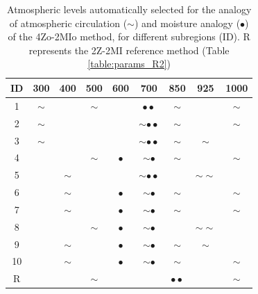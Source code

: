 \documentclass[review]{elsarticle}
\begin{document}
\begin{table}[t]
	\caption{Atmospheric levels automatically selected for the analogy of atmospheric circulation ($\sim$) and moisture analogy ($\bullet$) of the 4Zo-2MIo method, for different subregions (ID). R represents the 2Z-2MI reference method (Table \ref{table:params_R2})}
	\footnotesize
	\begin{center}
		\begin{tabular}{ccccccccc}
			\hline ID & 300 & 400 & 500 & 600 & 700 & 850 & 925 & 1000 \\ 
			\hline 
			1  & $\sim$ &   & $\sim$ &   & $\bullet \bullet$  & $\sim$ &   & $\sim$ \\
			2  & $\sim$ &   &   &   & $\sim \bullet \bullet$ & $\sim$ &   & $\sim$ \\
			3  & $\sim$ &   &   &   & $\sim \bullet \bullet$ & $\sim$ & $\sim$ &   \\
			4  &   &   & $\sim$ & $\bullet$ & $\sim \bullet$ & $\sim$ &   & $\sim$ \\
			5  &   & $\sim$ &   &   & $\sim \bullet \bullet$ &   & $\sim \sim$ &   \\
			6  &   & $\sim$ &   & $\bullet$ & $\sim \bullet$ & $\sim$ &   & $\sim$ \\
			7  &   & $\sim$ &   & $\bullet$ & $\sim \bullet$ & $\sim$ &   & $\sim$ \\
			8  &   &   & $\sim$ & $\bullet$ & $\sim \bullet$ &   & $\sim \sim$ &   \\
			9  &   & $\sim$ &   & $\bullet$ & $\sim \bullet$ & $\sim$ & $\sim$ &   \\
			10 &   & $\sim$ &   & $\bullet$ & $\sim \bullet$ & $\sim$ &   & $\sim$ \\
			\hline 
			R &   &   & $\sim$ &   &   & $\bullet \bullet$ &   & $\sim$ \\
			\hline 
		\end{tabular} 
	\end{center}
	\label{table:levels_GA_4Zo_2MIo}
\end{table}
\end{document}
